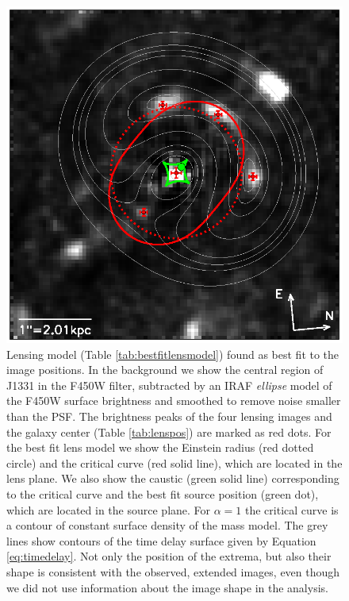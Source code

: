 \documentclass[useAMS,usenatbib]{mnras}
\begin{document}
\begin{figure}
\centering
  \includegraphics[width=\linewidth]{fig/lens_all_in_one.ps}
\caption{Lensing model (Table \ref{tab:bestfitlensmodel}) found as best fit to the image positions. In the background we show the central region of J1331 in the F450W filter, subtracted by an IRAF \emph{ellipse} model of the F450W surface brightness and smoothed to remove noise smaller than the PSF. The brightness peaks of the four lensing images and the galaxy center (Table \ref{tab:lenspos}) are marked as red dots. For the best fit lens model we show the Einstein radius (red dotted circle) and the critical curve (red solid line), which are located in the lens plane. We also show the caustic (green solid line) corresponding to the critical curve and the best fit source position (green dot), which are located in the source plane. For $\alpha=1$ the critical curve is a contour of constant surface density of the mass model. The grey  lines show contours of the time delay surface given by Equation \eqref{eq:timedelay}. Not only the position of the extrema, but also their shape is consistent with the observed, extended images, even though we did not use information about the image shape in the analysis.}
\label{fig:bestfitlensmodel}
\end{figure}
\end{document}
